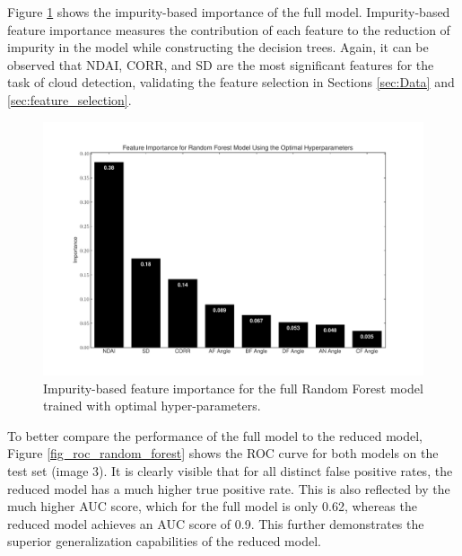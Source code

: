 \documentclass[11pt,letterpaper]{article}
\begin{document}
Figure \ref{fig_rf_feature_importance} shows the impurity-based importance of the full model. Impurity-based feature importance measures the contribution of each feature to the reduction of impurity in the model while constructing the decision trees. Again, it can be observed that NDAI, CORR, and SD are the most significant features for the task of cloud detection, validating the feature selection in Sections \ref{sec:Data} and \ref{sec:feature_selection}.

\begin{figure}[H]
    \centering
    \includegraphics[width=0.9\linewidth]{figs/random_forest_feature_importance.pdf}
    \caption{Impurity-based feature importance for the full Random Forest model trained with optimal hyper-parameters.}
    \label{fig_rf_feature_importance}
\end{figure}

To better compare the performance of the full model to the reduced model, Figure \ref{fig_roc_random_forest} shows the ROC curve for both models on the test set (image 3). It is clearly visible that for all distinct false positive rates, the reduced model has a much higher true positive rate. This is also reflected by the much higher AUC score, which for the full model is only 0.62, whereas the reduced model achieves an AUC score of 0.9. This further demonstrates the superior generalization capabilities of the reduced model.
\end{document}

